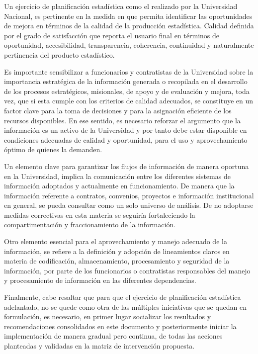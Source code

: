 \documentclass[
]{book}
\begin{document}
Un ejercicio de planificación estadística como el realizado por la Universidad Nacional, es pertinente en la medida en que permita identificar las oportunidades de mejora en términos de la calidad de la producción estadística. Calidad definida por el grado de satisfacción que reporta el usuario final en términos de oportunidad, accesibilidad, transparencia, coherencia, continuidad y naturalmente pertinencia del producto estadístico.

Es importante sensibilizar a funcionarios y contratistas de la Universidad sobre la importancia estratégica de la información generada o recopilada en el desarrollo de los procesos estratégicos, misionales, de apoyo y de evaluación y mejora, toda vez, que si esta cumple con los criterios de calidad adecuados, se constituye en un factor clave para la toma de decisiones y para la asignación eficiente de los recursos disponibles. En ese sentido, es necesario reforzar el argumento que la información es un activo de la Universidad y por tanto debe estar disponible en condiciones adecuadas de calidad y oportunidad, para el uso y aprovechamiento óptimo de quienes la demanden.

Un elemento clave para garantizar los flujos de información de manera oportuna en la Universidad, implica la comunicación entre los diferentes sistemas de información adoptados y actualmente en funcionamiento. De manera que la información referente a contratos, convenios, proyectos e información institucional en general, se pueda consultar como un solo universo de análisis. De no adoptarse medidas correctivas en esta materia se seguiría fortaleciendo la compartimentación y fraccionamiento de la información.

Otro elemento esencial para el aprovechamiento y manejo adecuado de la información, se refiere a la definición y adopción de lineamientos claros en materia de codificación, almacenamiento, procesamiento y seguridad de la información, por parte de los funcionarios o contratistas responsables del manejo y procesamiento de información en las diferentes dependencias.

Finalmente, cabe resaltar que para que el ejercicio de planificación estadística adelantado, no se quede como otra de las múltiples iniciativas que se quedan en formulación, es necesario, en primer lugar socializar los resultados y recomendaciones consolidados en este documento y posteriormente iniciar la implementación de manera gradual pero continua, de todas las acciones planteadas y validadas en la matriz de intervención propuesta.
\end{document}
